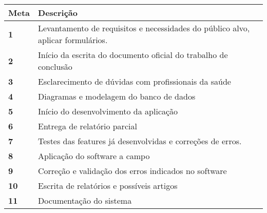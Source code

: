 \begin{center}
\begin{tabular}{ |p{3cm}|p{12cm}| } 
 \hline
 \textbf {Meta} & \textbf {Descrição}\\
 \hline
 \textbf{1} & Levantamento de requisitos e necessidades do público alvo, aplicar formulários. \\
 \hline
 \textbf{2} & Início da escrita do documento oficial do trabalho de conclusão \\ 
 \hline
 \textbf{3} & Esclarecimento de dúvidas com profissionais da saúde \\
 \hline
 \textbf{4} & Diagramas e modelagem do banco de dados \\
 \hline
 \textbf{5} & Início do desenvolvimento da aplicação \\
 \hline
 \textbf{6} & Entrega de relatório parcial\\
 \hline
 \textbf{7} & Testes das features já desenvolvidas e correções de erros. \\
 \hline
 \textbf{8} & Aplicação do software a campo \\ 
 \hline
 \textbf{9} & Correção e validação dos erros indicados no software \\
 \hline
 \textbf{10} & Escrita de relatórios e possíveis artigos \\
 \hline
 \textbf{11} & Documentação do sistema \\
 \hline
\end{tabular}
\end{center}

